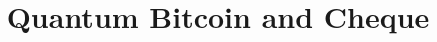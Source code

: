 \documentclass[letterpaper,aps,prc,superscriptaddress,nofootinbib,11pt,showpacs,floatfix]{revtex4-2}
\numberwithin{equation}{section}
\begin{document}
\title{Quantum Bitcoin and Cheque}



%
\tableofcontents
\newpage
\maketitle


\newpage

\newpage

\newpage

\newpage

\newpage

\newpage

\newpage

\newpage

\newpage



\newpage
\end{document}
